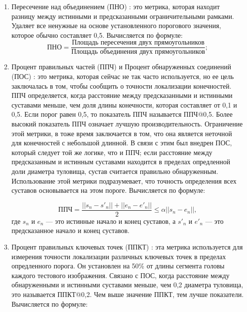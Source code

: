 \begin{enumerate}[label=\arabic*)]
	
	\item Пересечение над объединением (ПНО) \cite{IoU}: это метрика, которая находит разницу между истинными и предсказанными ограничительными рамками.
	Удаляет все ненужные на основе установленного порогового значения, которое обычно составляет 0,5.
	Вычисляется по формуле:
	\begin{equation}
		\text{ПНО} = \frac{\text{Площадь пересечения двух прямоугольников}}{\text{Площадь объединения двух прямоугольников}};
	\end{equation}
	
	\item Процент правильных частей (ППЧ) и Процент обнаруженных соединений (ПОС) \cite{PDJ}: это метрика, которая сейчас не так часто используется, но ее цель заключалась в том, чтобы сообщить о точности локализации конечностей.
	ППЧ определяется, когда расстояние между предсказанными и истинными суставами меньше, чем доля длины конечности, которая составляет от 0,1 и 0,5.
	Если порог равен 0,5, то показатель ППЧ называется ППЧ@0,5.
	Более высокий показатель ППЧ означает лучшую производительность.
	Ограничение этой метрики, в тоже время заключается в том, что она является неточной для конечностей с небольшой длинной.
	В связи с этим был внедрен ПОС, который следует той же логике, что и ППЧ; если расстояние между предсказанным и истинным суставами находится в пределах опредленной доли диаметра туловища, сустав считается правильно обнаруженным.
	Использование этой метрики подразумевает, что точность определения всех суставов основывается на этом пороге.
	Вычисляется по формуле:
	
	\begin{equation}
		\text{ППЧ} =  \frac{||s_n - s'_n|| + ||e_n - e'_n||}{2} \leq \alpha ||s_n - e_n||,
	\end{equation}
	где $s_n$ и $e_n$ --- это истинные начало и конец суставов, а $s'_n$ и $e'_n$ --- это предсказанное начало и конец суставов.
		
	\item Процент правильных ключевых точек  (ППКТ) \cite{guide-hpe}: эта метрика используется для измерения точности локализации различных ключевых точек в пределах опредленного порога.
	Он установлен на 50\% от длины сегмента головы каждого тестового изображения.
	Связано с ПОС, когда расстояние между обнаруженными и истинными суставами меньше, чем 0,2 диаметра туловища, это называется ППКТ@0,2.
	Чем выше значение ППКТ, тем лучше показатели.
	Вычисляется по формуле:
	

\end{enumerate}
